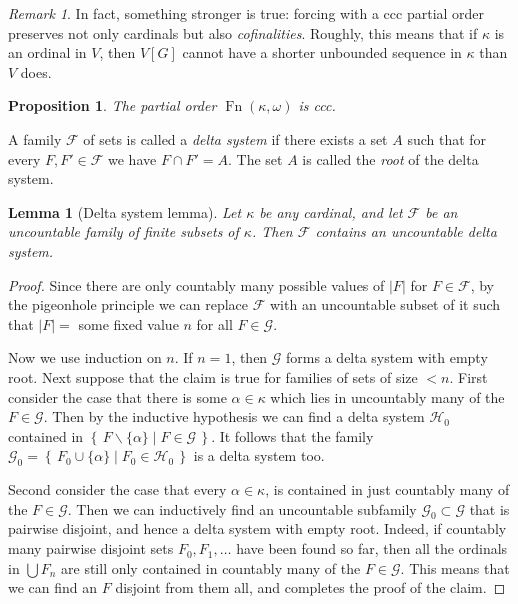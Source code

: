 \documentclass[11pt,oneside]{amsbook}
\newcommand{\set}[1]{\left\{\,#1\,\right\}}
\DeclareMathOperator{\Fn}{Fn}
\theoremstyle{definition}
\theoremstyle{plain}
\newtheorem{lemma}[theorem]{Lemma}
\newtheorem{proposition}[theorem]{Proposition}
\theoremstyle{definition}
\theoremstyle{remark}
\newtheorem{remark}[theorem]{Remark}
\numberwithin{equation}{section}
\numberwithin{figure}{section}
\begin{document}
\begin{remark}
  In fact, something stronger is true: forcing with a ccc partial order preserves not only cardinals but also \emph{cofinalities}. Roughly, this means that if $\kappa$ is an ordinal in $V$, then $V[G]$ cannot have a shorter unbounded sequence in $\kappa$ than $V$ does.
\end{remark}

\begin{proposition}
  \label{prop:cohen-ccc}
  The partial order $\Fn(\kappa,\omega)$ is ccc.
\end{proposition}

A family $\mathcal F$ of sets is called a \emph{delta system} if there exists a set $A$ such that for every $F,F'\in\mathcal F$ we have $F\cap F'=A$. The set $A$ is called the \emph{root} of the delta system.

\begin{lemma}[Delta system lemma]
  \label{lem:delta-system}
  Let $\kappa$ be any cardinal, and let $\mathcal F$ be an uncountable family of finite subsets of $\kappa$. Then $\mathcal F$ contains an uncountable delta system.
\end{lemma}

\begin{proof}
  Since there are only countably many possible values of $|F|$ for $F\in\mathcal F$, by the pigeonhole principle we can replace $\mathcal F$ with an uncountable subset of it such that $|F|=$ some fixed value $n$ for all $F\in\mathcal G$.

  Now we use induction on $n$. If $n=1$, then $\mathcal G$ forms a delta system with empty root. Next suppose that the claim is true for families of sets of size $<n$. First consider the case that there is some $\alpha\in\kappa$ which lies in uncountably many of the $F\in\mathcal G$. Then by the inductive hypothesis we can find a delta system $\mathcal H_0$ contained in $\set{F\smallsetminus\{\alpha\}\mid F\in\mathcal G}$. It follows that the family $\mathcal G_0=\set{F_0\cup\{\alpha\}\mid F_0\in\mathcal H_0}$ is a delta system too.

  Second consider the case that every $\alpha\in\kappa$, is contained in just countably many of the $F\in\mathcal G$. Then we can inductively find an uncountable subfamily $\mathcal G_0\subset\mathcal G$ that is pairwise disjoint, and hence a delta system with empty root. Indeed, if countably many pairwise disjoint sets $F_0,F_1,\ldots$ have been found so far, then all the ordinals in $\bigcup F_n$ are still only contained in countably many of the $F\in\mathcal G$. This means that we can find an $F$ disjoint from them all, and completes the proof of the claim.
\end{proof}
\end{document}
